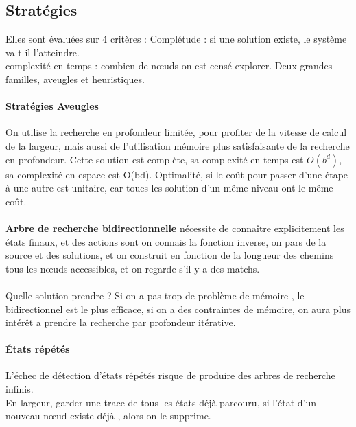 \documentclass{article}
\begin{document}
\subsection{Stratégies}
Elles sont évaluées sur 4 critères : Complétude : si une solution existe, le système va t il l'atteindre.\\complexité en temps : combien de nœuds on est censé explorer. Deux grandes familles, aveugles et heuristiques.
\paragraph{Stratégies Aveugles}
On utilise la recherche en profondeur limitée, pour profiter de la vitesse de calcul de la largeur, mais aussi de l'utilisation mémoire plus satisfaisante de la recherche en profondeur. Cette solution est complète, sa complexité en temps est $O(b^{d})$, sa complexité en espace est O(bd). Optimalité, si le coût pour passer d'une étape à une autre est unitaire, car toues les solution d'un même niveau ont le même coût.\\\\\textbf{Arbre de recherche bidirectionnelle} nécessite de connaître explicitement les états finaux, et des actions sont on connais la fonction inverse, on pars de la source et des solutions, et on construit en fonction de la longueur des chemins tous les nœuds accessibles, et on regarde s'il y a des matchs.\\\\Quelle solution prendre ? Si on a pas trop de problème de mémoire , le bidirectionnel est le plus efficace, si on a des contraintes de mémoire, on aura plus intérêt a prendre la recherche par profondeur itérative.
\paragraph{États répétés}
L’échec de détection d'états répétés risque de produire des arbres de recherche infinis.\\En largeur, garder une trace de tous les états déjà parcouru, si l'état d'un nouveau nœud existe déjà , alors on le supprime. 
\end{document}
